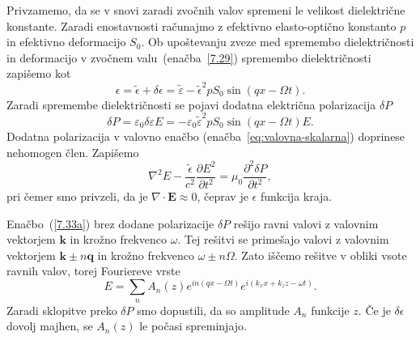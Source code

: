 Privzamemo, da se v snovi zaradi zvočnih valov spremeni le velikost
dielektrične konstante. Zaradi enostavnosti računajmo z efektivno elasto-optično
konstanto $p$ in efektivno deformacijo $S_0$. Ob upoštevanju zveze med
spremembo dielektričnosti in deformacijo
v zvočnem valu~(enačba~\ref{7.29}) spremembo dielektričnosti
zapišemo kot  
\begin{equation}
\epsilon=\tilde{\epsilon}+\delta\epsilon = 
\tilde{\varepsilon} -\tilde{\epsilon}^{2}pS_{0}\sin(qx-\Omega t).
\label{7.33}
\end{equation}
Zaradi spremembe dielektričnosti se pojavi dodatna električna polarizacija 
$\delta P$
\begin{equation}
\delta P = \varepsilon_0 \delta \varepsilon E = - \varepsilon_0 
\tilde{\varepsilon}^2 p S_0 \sin(qx-\Omega t)E.
\end{equation}
Dodatna polarizacija v valovno enačbo (enačba~\ref{eq:valovna-skalarna}) 
doprinese nehomogen člen. Zapišemo
\begin{equation}
\nabla^{2}E-\frac{\tilde{\epsilon}}{c^{2}}{\frac{\partial E^{2}}
{\partial t^{2}}}=\mu_{0}{\frac{\partial^2 \delta P}{\partial t^{2}}},
\label{7.33a}
\end{equation}
pri čemer smo privzeli, da je $\nabla\cdot\mathbf{E}\approx 0$, čeprav je
$\epsilon$ funkcija kraja. 

Enačbo~(\ref{7.33a}) brez dodane polarizacije $\delta P$ rešijo ravni valovi 
z valovnim vektorjem $\mathbf{k}$ in krožno frekvenco $\omega$. Tej rešitvi se 
primešajo valovi z valovnim vektorjem $\mathbf{k}\pm n\mathbf{q}$
in krožno frekvenco $\omega\pm n\Omega$. Zato iščemo rešitve v obliki vsote
ravnih valov, torej Fouriereve vrste
\begin{equation}
E=\sum_{n}A_{n}(z)e^{in(qx-\Omega t)}e^{i(k_{x}x+k_{z}z-\omega t)}.
\label{7.34}
\end{equation}
Zaradi sklopitve preko $\delta P$ smo dopustili, da so amplitude
$A_{n}$ funkcije $z$. Če je $\delta\epsilon$ dovolj majhen, se $A_{n}(z)$
le počasi spreminjajo.

